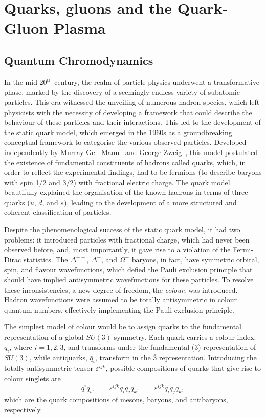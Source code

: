 \chapter{Quarks, gluons and the Quark-Gluon Plasma}
\section{Quantum Chromodynamics}
In the mid-20$^{\mathrm{th}}$ century, the realm of particle physics underwent a transformative phase, marked by the discovery of a seemingly endless variety of subatomic particles. This era witnessed the unveiling of numerous hadron species, which left physicists with the necessity of developing a framework that could describe the behaviour of these particles and their interactions. This led to the development of the static quark model, which emerged in the 1960s as a groundbreaking conceptual framework to categorise the various observed particles. Developed independently by Murray Gell-Mann~\cite{Gell-Mann:1964ewy} and George Zweig~\cite{Zweig:1964jf, Fritzsch:1972jv}, this model postulated the existence of fundamental constituents of hadrons called quarks, which, in order to reflect the experimental findings, had to be fermions (to describe baryons with spin 1/2 and 3/2) with fractional electric charge. The quark model beautifully explained the organisation of the known hadrons in terms of three quarks ($u$, $d$, and $s$), leading to the development of a more structured and coherent classification of particles.

Despite the phenomenological success of the static quark model, it had two problems: it introduced particles with fractional charge, which had never been observed before, and, most importantly, it gave rise to a violation of the Fermi-Dirac statistics. The $\Delta^{++}$, $\Delta^{-}$, and $\Omega^{-}$ baryons, in fact, have symmetric orbital, spin, and flavour wavefunctions, which defied the Pauli exclusion principle that should have implied antisymmetric wavefunctions for these particles. To resolve these inconsistencies, a new degree of freedom, the \emph{colour}, was introduced. Hadron wavefunctions were assumed to be totally antisymmetric in colour quantum numbers, effectively implementing the Pauli exclusion principle.

The simplest model of colour would be to assign quarks to the fundamental representation of a global $SU(3)$ symmetry. Each quark carries a colour index: $q_i$, where $i = 1, 2, 3$, and transforms under the fundamental ($3$) representation of $SU(3)$, while antiquarks,  $\bar{q}_i$, transform in the $\bar{3}$ representation. Introducing the totally antisymmetric tensor $\varepsilon^{ijk}$, possible compositions of quarks that give rise to colour singlets are 
\begin{equation*}
    \bar{q}^iq_i,\qquad \varepsilon^{ijk}q_iq_jq_k,\qquad \varepsilon^{ijk}\bar{q_i}\bar{q_j}\bar{q_k},
\end{equation*}
which are the quark compositions of mesons, baryons, and antibaryons, respectively. 

